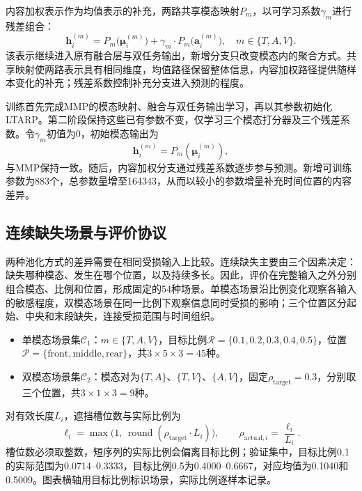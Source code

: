 \documentclass[UTF8,a4paper,11pt]{ctexart}
\newcommand{\QTwoParagraph}{\par\noindent\hspace*{2em}}
\newcounter{q2algorithm}
\begin{document}
\QTwoParagraph 内容加权表示作为均值表示的补充，两路共享模态映射$P_m$，以可学习系数$\gamma_m$进行残差组合：
\begin{equation}
\mathbf h_i^{(m)} = P_m\big(\boldsymbol\mu_i^{(m)}\big) + \gamma_m \cdot P_m\big(\mathbf a_i^{(m)}\big), \quad m \in \{T, A, V\}.
\label{eq:q2_residual_composite}
\end{equation}
该表示继续进入原有融合层与双任务输出，新增分支只改变模态内的聚合方式。共享映射使两路表示具有相同维度，均值路径保留整体信息，内容加权路径提供随样本变化的补充；残差系数控制补充分支进入预测的程度。

\QTwoParagraph 训练首先完成MMP的模态映射、融合与双任务输出学习，再以其参数初始化LTARP。第二阶段保持这些已有参数不变，仅学习三个模态打分器及三个残差系数。令$\gamma_m$初值为0，初始模态输出为
\begin{equation}
\mathbf h_i^{(m)} = P_m(\boldsymbol\mu_i^{(m)}),
\end{equation}
与MMP保持一致。随后，内容加权分支通过残差系数逐步参与预测。新增可训练参数为883个，总参数量增至164343，从而以较小的参数增量补充时间位置的内容差异。

\subsection{连续缺失场景与评价协议}\label{subsec:q2_benchmark}
\QTwoParagraph 两种池化方式的差异需要在相同受损输入上比较。连续缺失主要由三个因素决定：缺失哪种模态、发生在哪个位置，以及持续多长。因此，评价在完整输入之外分别组合模态、比例和位置，形成固定的54种场景。单模态场景沿比例变化观察各输入的敏感程度，双模态场景在同一比例下观察信息同时受损的影响；三个位置区分起始、中央和末段缺失，连接受损范围与时间组织。

\begin{itemize}[leftmargin=2.5em,itemsep=0pt,topsep=2pt]
\item 单模态场景集$\mathcal C_1$：$m\in\{T,A,V\}$，目标比例$\mathcal R=\{0.1,0.2,0.3,0.4,0.5\}$，位置$\mathcal P=\{\mathrm{front},\mathrm{middle},\mathrm{rear}\}$，共$3\times5\times3=45$种。
\item 双模态场景集$\mathcal C_2$：模态对为$\{T,A\}$、$\{T,V\}$、$\{A,V\}$，固定$\rho_{\mathrm{target}}=0.3$，分别取三个位置，共$3\times1\times3=9$种。
\end{itemize}

\QTwoParagraph 对有效长度$L_i$，遮挡槽位数与实际比例为
\begin{equation}
\ell_i = \max\big(1,\, \operatorname{round}(\rho_{\mathrm{target}} \cdot L_i)\big),\qquad
\rho_{\mathrm{actual}, i} = \frac{\ell_i}{L_i}.
\label{eq:q2_mask_len}
\end{equation}
槽位数必须取整数，短序列的实际比例会偏离目标比例；验证集中，目标比例0.1的实际范围为0.0714--0.3333，目标比例0.5为0.4000--0.6667，对应均值为0.1040和0.5009。图表横轴用目标比例标识场景，实际比例逐样本记录。
\end{document}
